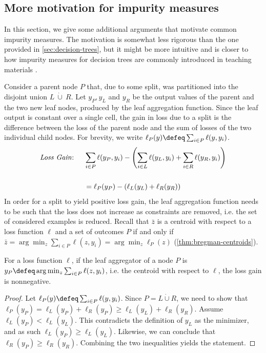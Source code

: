\documentclass[
	twoside=false, %
]{kaobook}
\begin{document}
\subsection{More motivation for impurity measures}
\label{sec:splitting-criteria-greedily-minimise-loss-functions}

In this section, we give some additional arguments that motivate common impurity measures. The motivation is somewhat less rigorous than the one provided in \cref{sec:decision-trees}, but it might be more intuitive and is closer to how impurity measures for decision trees are commonly introduced in teaching materials \cite{tibshirani_ElementsStatisticalLearning_2017}.

Consider a parent node $P$ that, due to some split, was partitioned into the disjoint union $L~\dot{\cup}~R$.
Let $y_{P}, y_{L}$ and $y_{R}$ be the output values of the parent and the two new leaf nodes, produced by the leaf aggregation function. Since the leaf output is constant over a single cell, the gain in loss due to a split is the difference between the loss of the parent node and the sum of losses of the two individual child nodes.
For brevity, we write $\ell_{P}(y) \defeq \sum_{i \in P} \ell(y, y_{i})$.
\begin{align*}
\text{\textit{Loss Gain}: } \hspace{1em} &
\sum_{i \in P} \ell(y_{P}, y_{i}) - \left(  \sum_{i \in L} \ell(y_{L}, y_{i}) + \sum_{i \in R} \ell(y_{R}, y_{i}) \right) \\[1.5em]
&= \ell_P(y_P) - \left(\ell_L(y_L) + \ell_R(y_R) \right)
\end{align*}
In order for a split to yield positive loss gain, the leaf aggregation function needs to be such that the loss does not increase as constraints are removed, i.e. the set of considered examples is reduced. Recall that $\bar{z}$ is a centroid with respect to a loss function $\ell$ and a set of outcomes $P$ if and only if $\bar{z} = \arg\min_{z} \sum_{i \in P} \ell(z, y_{i}) = \arg\min_z \ell_P(z)$ (\ref{thm:bregman-centroids}).
\begin{lemma}
\label{lemma:loss-gain-nonnegative}
For a loss function $\ell$, if the leaf aggregator of a node $P$ is $y_{P} \defeq \arg\min_{z} \sum_{i \in P} \ell(z, y_{i})$, i.e. the centroid with respect to $\ell$, the loss gain is nonnegative.
\end{lemma}
\begin{proof}
Let $\ell_{P}(y) \defeq \sum_{i \in P} \ell(y, y_{i})$. Since $P = L \dot{\cup}R$, we need to show that $\ell_{P}(y_{P}) = \ell_{L}(y_{P}) + \ell_{R}(y_{P}) \geq \ell_{L}(y_{L}) + \ell_{R}(y_{R})$. Assume $\ell_{L}(y_{P}) < \ell_{L}(y_{L})$. This contradicts the definition of $y_{L}$ as the minimizer, and as such $\ell_{L}(y_{P}) \geq \ell_{L}(y_{L})$. Likewise, we can conclude that $\ell_{R}(y_{P}) \geq \ell_{R}(y_{R})$. Combining the two inequalities yields the statement.
\end{proof}
\end{document}
